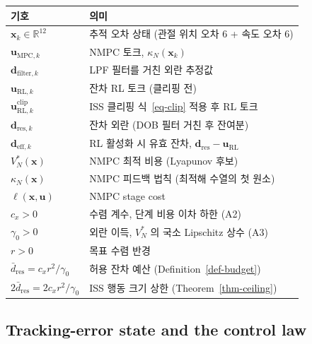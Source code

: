 \documentclass[
  11pt,
]{article}
\newcounter{none} %
\theoremstyle{plain}
\theoremstyle{plain}
\theoremstyle{definition}
\theoremstyle{remark}
\begin{document}
{\def\LTcaptype{none} %
\begin{longtable}[]{@{}
  >{\raggedright\arraybackslash}p{}
  >{\raggedright\arraybackslash}p{}@{}}
\toprule\noalign{}
\begin{minipage}[b]{\linewidth}\raggedright
기호
\end{minipage} & \begin{minipage}[b]{\linewidth}\raggedright
의미
\end{minipage} \\
\midrule\noalign{}
\endhead
\bottomrule\noalign{}
\endlastfoot
\(\bm{x}_k \in \mathbb{R}^{12}\) & 추적 오차 상태 (관절 위치 오차 6 +
속도 오차 6) \\
\(\bm{u}_{\mathrm{MPC},k}\) & NMPC 토크, \(\kappa_N(\bm{x}_k)\) \\
\(\bm{d}_{\mathrm{filter},k}\) & LPF 필터를 거친 외란 추정값 \\
\(\bm{u}_{\mathrm{RL},k}\) & 잔차 RL 토크 (클리핑 전) \\
\(\bm{u}_{\mathrm{RL},k}^{\mathrm{clip}}\) & ISS 클리핑 식~\ref{eq-clip}
적용 후 RL 토크 \\
\(\bm{d}_{\mathrm{res},k}\) & 잔차 외란 (DOB 필터 거친 후 잔여분) \\
\(\bm{d}_{\mathrm{eff},k}\) & RL 활성화 시 유효 잔차,
\(\bm{d}_{\mathrm{res}}-\bm{u}_{\mathrm{RL}}\) \\
\(V_N^*(\bm{x})\) & NMPC 최적 비용 (Lyapunov 후보) \\
\(\kappa_N(\bm{x})\) & NMPC 피드백 법칙 (최적해 수열의 첫 원소) \\
\(\ell(\bm{x},\bm{u})\) & NMPC stage cost \\
\(c_x > 0\) & 수렴 계수, 단계 비용 이차 하한 (A2) \\
\(\gamma_0 > 0\) & 외란 이득, \(V_N^*\) 의 국소 Lipschitz 상수 (A3) \\
\(r > 0\) & 목표 수렴 반경 \\
\(\bar{d}_{\mathrm{res}} = c_x r^2/\gamma_0\) & 허용 잔차 예산
(Definition~\ref{def-budget}) \\
\(2\bar{d}_{\mathrm{res}} = 2c_x r^2/\gamma_0\) & ISS 행동 크기 상한
(Theorem~\ref{thm-ceiling}) \\
\end{longtable}
}

\subsection{Tracking-error state and the control
law}\label{tracking-error-state-and-the-control-law}
\end{document}
